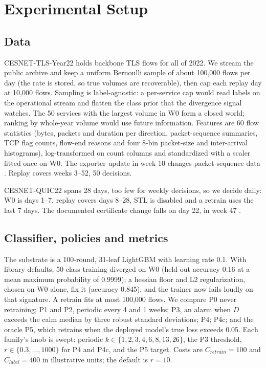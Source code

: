 \documentclass[conference]{IEEEtran}
\begin{document}
\section{Experimental Setup}\label{sec:setup}
\subsection{Data}
CESNET-TLS-Year22 \cite{hynek2024} holds backbone TLS flows for all of 2022. We stream the public archive and keep a uniform Bernoulli sample of about 100,000 flows per day (the rate is stored, so true volumes are recoverable), then cap each replay day at 10,000 flows. Sampling is label-agnostic: a per-service cap would read labels on the operational stream and flatten the class prior that the divergence signal watches. The 50 services with the largest volume in W0 form a closed world; ranking by whole-year volume would use future information. Features are 60 flow statistics (bytes, packets and duration per direction, packet-sequence summaries, TCP flag counts, flow-end reasons and four 8-bin packet-size and inter-arrival histograms), log-transformed on count columns and standardized with a scaler fitted once on W0. The exporter update in week 10 changes packet-sequence data \cite{hynek2024}. Replay covers weeks 3--52, 50 decisions.

CESNET-QUIC22 \cite{luxemburk2023dib} spans 28 days, too few for weekly decisions, so we decide daily: W0 is days 1--7, replay covers days 8--28, STL is disabled and a retrain uses the last 7 days. The documented certificate change falls on day 22, in week 47 \cite{luxemburk2023}.

\subsection{Classifier, policies and metrics}
The substrate is a 100-round, 31-leaf LightGBM \cite{ke2017} with learning rate 0.1. With library defaults, 50-class training diverged on W0 (held-out accuracy 0.16 at a mean maximum probability of 0.9999); a hessian floor and L2 regularization, chosen on W0 alone, fix it (accuracy 0.845), and the trainer now fails loudly on that signature. A retrain fits at most 100,000 flows. We compare P0 never retraining; P1 and P2, periodic every 4 and 1 weeks; P3, an alarm when $D$ exceeds the calm median by three robust standard deviations; P4; P4c; and the oracle P5, which retrains when the deployed model's true loss exceeds 0.05. Each family's knob is swept: periodic $k\in\{1,2,3,4,6,8,13,26\}$, the P3 threshold, $r\in\{0.3,\dots,1000\}$ for P4 and P4c, and the P5 target. Costs are $C_{retrain}=100$ and $C_{label}=400$ in illustrative units; the default is $r=10$.
\end{document}
